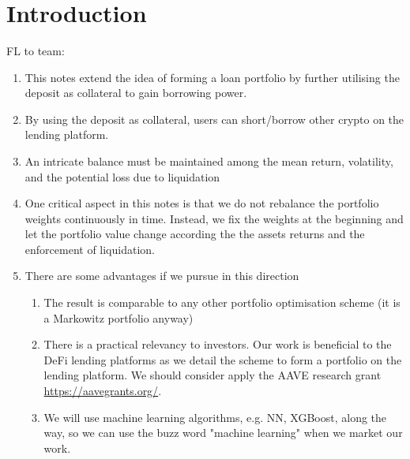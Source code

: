 \documentclass{article} %
\theoremstyle{plain}
\theoremstyle{definition} %
\begin{document}
\setlength{\boxlength}{0.95\textwidth} %
\title{\large{\bf{}}} %
\author{{\normalsize\bf{}}}%
\thispagestyle{empty}
\addtocounter{page}{1}
\maketitle

\vspace{.5cm}
\def\contentsname{Contents}
\tableofcontents
\vspace{.5cm}

\section{Introduction}
FL to team: 
\begin{enumerate}
  \item This notes extend the idea of forming a loan portfolio by further utilising the deposit as collateral to gain borrowing power.
  \item By using the deposit as collateral, users can short/borrow other crypto on the lending platform.
  \item An intricate balance must be maintained among the mean return, volatility, and the potential loss due to liquidation
  \item One critical aspect in this notes is that we do not rebalance the portfolio weights continuously in time.
  Instead, we fix the weights at the beginning and let the portfolio value change according the the assets returns and the enforcement of liquidation. 
  \item There are some advantages if we pursue in this direction
  \begin{enumerate}
    \item The result is comparable to any other portfolio optimisation scheme (it is a Markowitz portfolio anyway)
    \item There is a practical relevancy to investors. Our work is beneficial to the DeFi lending platforms as we detail the scheme to form a portfolio on the lending platform. 
    We should consider apply the AAVE research grant \url{https://aavegrants.org/}.
    \item We will use machine learning algorithms, e.g. NN, XGBoost, along the way, so we can use the buzz word "machine learning" when we market our work. 
  \end{enumerate}
\end{enumerate}
\end{document}
